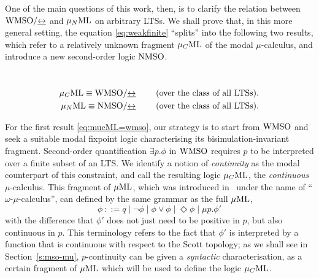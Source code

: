 One of the main questions of this work, then, is to clarify the relation between
$\mathrm{WMSO}/{\mathrel{\underline{\leftrightarrow}}}$ and $\mu_{N}\mathrm{ML}$ on arbitrary LTSs. 
We shall prove that, in this more general setting, the equation 
\eqref{eq:weakfinite} ``splits'' into the following two results, which refer to 
a relatively unknown fragment $\mu_{C}\mathrm{ML}$ of the modal $\mu$-calculus, and 
introduce a new second-order logic $\mathrm{NMSO}$.

\begin{theorem}~
   \label{t:11}
\begin{eqnarray}
   \mu_{C}\mathrm{ML} \equiv \mathrm{WMSO}/{\mathrel{\underline{\leftrightarrow}}} \qquad  \text{ (over the class of all LTSs)}. 
\label{eq:mucML=wmso} 
\\ \mu_{N}\mathrm{ML} \equiv \mathrm{NMSO}/{\mathrel{\underline{\leftrightarrow}}}  \qquad \text{ (over the class of all LTSs)}. 
\label{eq:afmc=nmso}
\end{eqnarray}
\end{theorem}
For the first result \eqref{eq:mucML=wmso}, our strategy is to start from 
$\mathrm{WMSO}$ and seek a suitable modal fixpoint logic characterising its 
bisimulation-invariant fragment. 
Second-order quantification $\exists p.\phi$ in $\mathrm{WMSO}$ requires $p$ to be 
interpreted over a finite subset of an LTS. 
We identify a notion of \emph{continuity} as the modal counterpart of this 
constraint, and call the resulting logic $\mu_{C}\mathrm{ML}$, the \emph{continuous} 
$\mu$-calculus. 
This fragment of $\mu\mathrm{ML}$, which was introduced in~\cite{bent06:moda}
under the name of ``$\omega$-$\mu$-calculus'', can defined by the same grammar as 
the full $\mu\mathrm{ML}$,
\begin{equation*}
\phi\ ::= q \mid \neg\phi \mid 
    \phi \lor \phi \mid  \Diamond \phi \mid
    \mu p.\phi' 
\end{equation*}
with the difference that $\phi'$ does not just need to be positive in $p$, but 
also continuous in $p$.
This terminology refers to the fact that $\phi'$ is interpreted by a function 
that is continuous with respect to the Scott topology; as we shall see
in Section~\ref{s:mso-mu}, $p$-continuity can be given a \emph{syntactic} 
characterisation, as a certain fragment of $\mu\mathrm{ML}$ which will be used to define
the logic $\mu_{C}\mathrm{ML}$.

